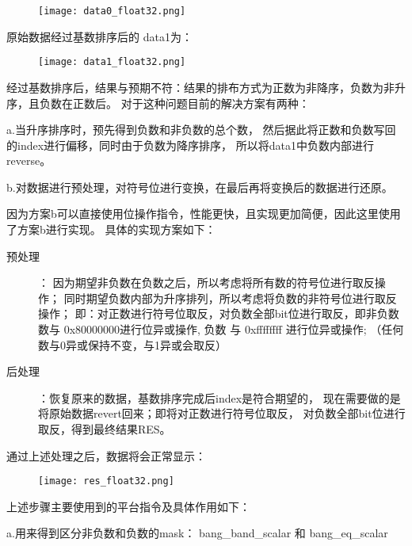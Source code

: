 \begin{figure}[ht]
    \centering
    \texttt{[image: data0\_float32.png]}
    \caption{}
    \label{fig:data0}
\end{figure}


原始数据经过基数排序后的 data1为：

\begin{figure}[ht]
    \centering
    \texttt{[image: data1\_float32.png]}
    \caption{}
    \label{fig:data1}
\end{figure}


经过基数排序后，结果与预期不符：结果的排布方式为正数为非降序，负数为非升序，且负数在正数后。
对于这种问题目前的解决方案有两种：

a.当升序排序时，预先得到负数和非负数的总个数，
然后据此将正数和负数写回的index进行偏移，同时由于负数为降序排序，
所以将data1中负数内部进行reverse。 

b.对数据进行预处理，对符号位进行变换，在最后再将变换后的数据进行还原。

因为方案b可以直接使用位操作指令，性能更快，且实现更加简便，因此这里使用了方案b进行实现。
具体的实现方案如下：
\begin{description}
\item[预处理]：
因为期望非负数在负数之后，所以考虑将所有数的符号位进行取反操作；
同时期望负数内部为升序排列，所以考虑将负数的非符号位进行取反操作；
即：对正数进行符号位取反，对负数全部bit位进行取反，即非负数数与 0x80000000进行位异或操作, 
负数 与 0xffffffff 进行位异或操作; （任何数与0异或保持不变，与1异或会取反）

\item[后处理]：恢复原来的数据，基数排序完成后index是符合期望的，
现在需要做的是将原始数据revert回来；即将对正数进行符号位取反，
对负数全部bit位进行取反，得到最终结果RES。
\end{description}


通过上述处理之后，数据将会正常显示：

\begin{figure}[ht]
    \centering
    \texttt{[image: res\_float32.png]}
    \caption{}
    \label{fig:res_int32}
\end{figure}


上述步骤主要使用到的平台指令及具体作用如下：

a.用来得到区分非负数和负数的mask： bang\_band\_scalar 和 bang\_eq\_scalar

